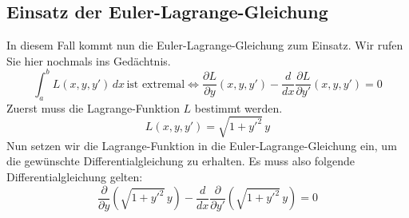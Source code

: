 \subsection{Einsatz der Euler-Lagrange-Gleichung
\label{kettenlinie:subsection:Einsatz der Euler-Lagrange-Gleichung}}
In diesem Fall kommt nun die Euler-Lagrange-Gleichung zum Einsatz. Wir rufen Sie hier nochmals ins Gedächtnis.
\begin{equation}
	\int_{a}^{b} L(x, y, y') \, dx \, \text{ist extremal} \iff \frac{\partial L}{\partial y}(x, y, y') - \frac{d}{dx} \frac{\partial L}{\partial y'}(x, y, y') = 0
\end{equation}
Zuerst muss die Lagrange-Funktion \(L\) bestimmt werden.
\begin{equation}
	L(x, y, y')
	=
	\sqrt{1 + y'^2} \, y
\end{equation}
Nun setzen wir die Lagrange-Funktion in die Euler-Lagrange-Gleichung ein, um die gewünschte Differentialgleichung zu erhalten. Es muss also folgende Differentialgleichung gelten:
\begin{equation}
\frac{\partial}{\partial y} \left( \sqrt{1 + y'^2} \, y \right) - \frac{d}{dx} \frac{\partial}{\partial y'} \left( \sqrt{1 + y'^2} \, y \right) = 0
\end{equation} 